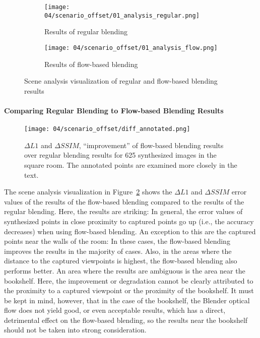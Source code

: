 \begin{figure}
\centering
    \hfill
    \begin{subfigure}[b]{0.45\textwidth}
            \centering
            \texttt{[image: 04/scenario\_offset/01\_analysis\_regular.png]}
            \caption{Results of regular blending}
    \end{subfigure}
    \hfill
    \begin{subfigure}[b]{0.45\textwidth}
            \centering
            \texttt{[image: 04/scenario\_offset/01\_analysis\_flow.png]}
            \caption{Results of flow-based blending}
    \end{subfigure}
    \hfill
  \caption{Scene analysis visualization of regular and flow-based blending results} \label{fig:offset_regular_flow}
\end{figure}

\paragraph{Comparing Regular Blending to Flow-based Blending Results}

\begin{figure}
		\centering
		\texttt{[image: 04/scenario\_offset/diff\_annotated.png]}
		\caption[$\Delta L1$ and $\Delta SSIM$ for 625 synthesized images in the square room]{$\Delta L1$ and $\Delta SSIM$, ``improvement'' of flow-based blending results over regular blending results for 625 synthesized images in the square room. The annotated points are examined more closely in the text.}
		\label{fig:scenario_offset_diff}
\end{figure}

The scene analysis visualization in Figure~\ref{fig:scenario_offset_diff} shows the $\Delta L1$ and $\Delta SSIM$ error values of the results of the flow-based blending compared to the results of the regular blending. Here, the results are striking: In general, the error values of synthesized points in close proximity to captured points go up (i.e., the accuracy decreases) when using flow-based blending.
An exception to this are the captured points near the walls of the room: In these cases, the flow-based blending improves the results in the majority of cases. Also, in the areas where the distance to the captured viewpoints is highest, the flow-based blending also performs better.
An area where the results are ambiguous is the area near the bookshelf. Here, the improvement or degradation cannot be clearly attributed to the proximity to a captured viewpoint or the proximity of the bookshelf. It must be kept in mind, however, that in the case of the bookshelf, the Blender optical flow does not yield good, or even acceptable results, which has a direct, detrimental effect on the flow-based blending, so the results near the bookshelf should not be taken into strong consideration.

